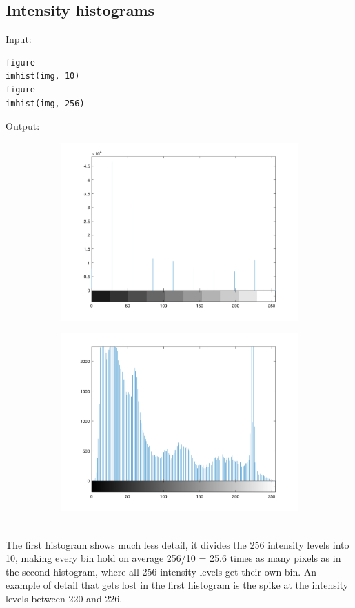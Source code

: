 \documentclass[12pt, a4paper]{article}
\begin{document}
\subsection{Intensity histograms}
Input:
\begin{verbatim}
figure
imhist(img, 10)
figure
imhist(img, 256)
\end{verbatim}
Output:
\begin{figure}[H]
    \centering %
    \begin{subfigure}[b]{0.7\textwidth}
        \includegraphics[width=\textwidth]{fig3.png}
    \end{subfigure}
    \begin{subfigure}[b]{0.7\textwidth}
        \includegraphics[width=\textwidth]{fig4.png}
    \end{subfigure}
\end{figure}
~\\
The first histogram shows much less detail, it divides the 256 intensity levels into 10, making every bin hold on average 256/10 = 25.6 times as many pixels as in the second histogram, where all 256 intensity levels get their own bin. An example of detail that gets lost in the first histogram is the spike at the intensity levels between 220 and 226.
\end{document}
